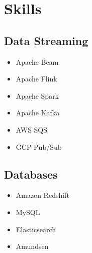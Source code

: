 \documentclass[letterpaper]{resume}
\begin{document}
\begin{minipage}[t]{0.27\textwidth} %


\section{Skills}

\subsection{Data Streaming}
\begin{itemize}
\item Apache Beam
\item Apache Flink
\item Apache Spark
\end{itemize}

\begin{itemize}
\item Apache Kafka
\item AWS SQS
\item GCP Pub/Sub
\end{itemize}

\sectionspace %


\subsection{Databases}
\begin{itemize}
\item Amazon Redshift
\item MySQL
\end{itemize}

\begin{itemize}
\item Elasticsearch
\end{itemize}

\begin{itemize}
\item Amundsen
\end{itemize}

\sectionspace %


\end{minipage}
\end{document}
